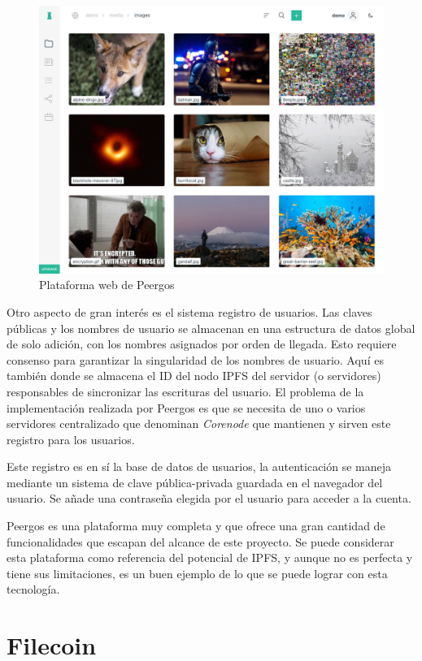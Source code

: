 \begin{figure}[H]
    \centering
    \small
    \includegraphics[width=0.8\linewidth]{images/peergos.jpg}
    \caption{Plataforma web de Peergos}
    \label{fig:peergos}
\end{figure}

Otro aspecto de gran interés es el sistema registro de usuarios. Las claves públicas y los nombres de usuario se almacenan en una estructura de datos global de solo adición,
con los  nombres asignados por orden de llegada. Esto requiere consenso para garantizar la singularidad de los nombres de usuario.
Aquí es también donde se almacena el ID del nodo IPFS del servidor (o servidores) responsables de sincronizar las escrituras del
usuario. El problema de la implementación realizada por Peergos es que se necesita de uno o varios servidores centralizado
que denominan \textit{Corenode} que mantienen y sirven este registro para los usuarios.

Este registro es en sí la base de datos de usuarios, la autenticación se maneja mediante un sistema de clave pública-privada
guardada en el navegador del usuario. Se añade una contraseña elegida por el usuario para acceder a la cuenta.

Peergos es una plataforma muy completa y que ofrece una gran cantidad de funcionalidades que escapan del alcance de este proyecto.
Se puede considerar esta plataforma como referencia del potencial de IPFS, y aunque no es perfecta y tiene sus limitaciones, es un buen ejemplo de lo que se puede lograr con esta tecnología.

\section{Filecoin}

